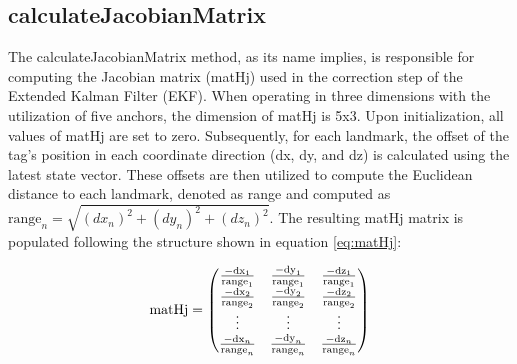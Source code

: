 \subsection{calculateJacobianMatrix}
\label{sub:calculateJacobianMatrix}
The  calculateJacobianMatrix method, as its name implies, is responsible for computing the Jacobian matrix (matHj) used in the correction step of the Extended Kalman Filter (EKF). When operating in three dimensions with the utilization of five anchors, the dimension of matHj is 5x3.
\vspace{4pt}
\newline
Upon initialization, all values of matHj are set to zero. Subsequently, for each landmark, the offset of the tag's position in each coordinate direction (dx, dy, and dz) is calculated using the latest state vector. These offsets are then utilized to compute the Euclidean distance to each landmark, denoted as range and computed as $\textrm{range}_n = \sqrt{(dx_n)^2 + (dy_n)^2 + (dz_n)^2}$.
\vspace{4pt}
\newline
The resulting matHj matrix is populated following the structure shown in equation \ref{eq:matHj}:

\begin{equation}
\begin{centering}
	\textrm{matHj} =
	\begin{pmatrix}
		\frac{-\textrm{dx}_1}{\textrm{range}_1} & \frac{-\textrm{dy}_1}{\textrm{range}_1} & \frac{-\textrm{dz}_1}{\textrm{range}_1} \\
		\frac{-\textrm{dx}_2}{\textrm{range}_2} & \frac{-\textrm{dy}_2}{\textrm{range}_2} & \frac{-\textrm{dz}_2}{\textrm{range}_2} \\
		\vdots & \vdots & \vdots \\
		\frac{-\textrm{dx}_n}{\textrm{range}_n} & \frac{-\textrm{dy}_n}{\textrm{range}_n} & \frac{-\textrm{dz}_n}{\textrm{range}_n} \\
	\end{pmatrix}
\end{centering}
\label{eq:matHj}
\end{equation}

